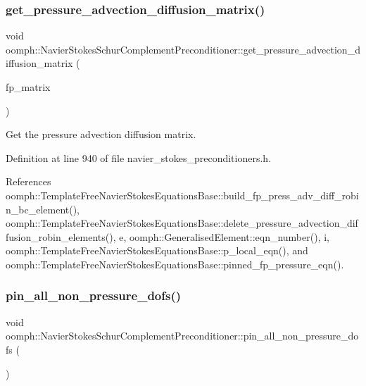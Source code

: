 \subsubsection{\texorpdfstring{get\+\_\+pressure\+\_\+advection\+\_\+diffusion\+\_\+matrix()}{get\_pressure\_advection\_diffusion\_matrix()}}
{\footnotesize\ttfamily void oomph\+::\+Navier\+Stokes\+Schur\+Complement\+Preconditioner\+::get\+\_\+pressure\+\_\+advection\+\_\+diffusion\+\_\+matrix (\begin{DoxyParamCaption}\item[{\hyperlink{classoomph_1_1CRDoubleMatrix}{C\+R\+Double\+Matrix} \&}]{fp\+\_\+matrix }\end{DoxyParamCaption})\hspace{0.3cm}{\ttfamily [inline]}}



Get the pressure advection diffusion matrix. 



Definition at line 940 of file navier\+\_\+stokes\+\_\+preconditioners.\+h.



References oomph\+::\+Template\+Free\+Navier\+Stokes\+Equations\+Base\+::build\+\_\+fp\+\_\+press\+\_\+adv\+\_\+diff\+\_\+robin\+\_\+bc\+\_\+element(), oomph\+::\+Template\+Free\+Navier\+Stokes\+Equations\+Base\+::delete\+\_\+pressure\+\_\+advection\+\_\+diffusion\+\_\+robin\+\_\+elements(), e, oomph\+::\+Generalised\+Element\+::eqn\+\_\+number(), i, oomph\+::\+Template\+Free\+Navier\+Stokes\+Equations\+Base\+::p\+\_\+local\+\_\+eqn(), and oomph\+::\+Template\+Free\+Navier\+Stokes\+Equations\+Base\+::pinned\+\_\+fp\+\_\+pressure\+\_\+eqn().

\mbox{\label{classoomph_1_1NavierStokesSchurComplementPreconditioner_a03941c01d70ece07797301c8ac6a0a8a}} 
\subsubsection{\texorpdfstring{pin\+\_\+all\+\_\+non\+\_\+pressure\+\_\+dofs()}{pin\_all\_non\_pressure\_dofs()}}
{\footnotesize\ttfamily void oomph\+::\+Navier\+Stokes\+Schur\+Complement\+Preconditioner\+::pin\+\_\+all\+\_\+non\+\_\+pressure\+\_\+dofs (\begin{DoxyParamCaption}{ }\end{DoxyParamCaption})\hspace{0.3cm}{\ttfamily [inline]}}



